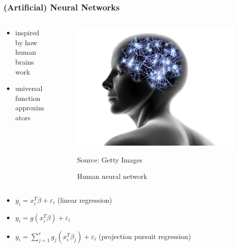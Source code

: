 \documentclass[handout]{beamer}
\begin{document}
\begin{frame}
\frametitle{(Artificial) Neural Networks}

\begin{columns}[onlytextwidth]
\begin{column}{.6\textwidth}
\begin{itemize}
    \item inspired by how human brains work
    \item universal function approximators
\end{itemize}
\end{column}
\begin{column}{.4\textwidth}
\begin{center}
\begin{figure}[h]
\caption{Human neural network}
\centering
\includegraphics[scale=0.12]{pics/brain.jpeg}
\begin{minipage}{0.65\textwidth} %
{\scriptsize \hspace{3mm} Source: Getty Images \par}
\end{minipage}
\end{figure}
\end{center}
\end{column}        
\end{columns}


\begin{itemize}
    \pause
    \item $y_i = x_i^T \beta + \varepsilon_i$ \hspace{15mm} (linear regression)
    \vspace{2mm}
    \pause
    \item $y_i = g(x_i^T \beta) + \varepsilon_i$
    \pause
    \item $\displaystyle y_i=\sum_{j=1}^rg_j(x_i^T \beta_j) + \varepsilon_i$ \hspace{2mm} (projection pursuit regression)
\end{itemize}




\end{frame}
\end{document}
